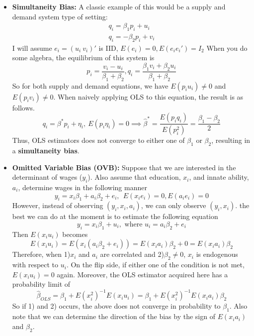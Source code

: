 \begin{itemize}
\begin{mdframed}[backgroundcolor=yellow!5] 
\begin{comment}[Comment on Measurement Errors]
So how do we address the endogeneity problem?
\begin{itemize}
\item If there exists another noisy, but unbiased measure of $x_i^*$, namely $w_i=x_i^*+\delta_i$, we can use $w_i$ to instrument for $x_i$. The condition is that $\eta_i$ has mean zero and uncorrelated with $(x_i^*, e_i. v_i)$. Try verifying that this satisfies all IV conditions. 
\item If there is a measurement error in $y_i$, the only this it does is to change the component of $e_i$. Assuming all the old assumptions hold, this does not pose as much problem as having a measurement error in the regressor. 
\end{itemize}
\end{comment}
\end{mdframed}
\item \textbf{Simultaneity Bias: } A classic example of this would be a supply and demand system type of setting:
\begin{gather*}
q_i = \beta_1p_i+u_i \tag{Supply}\\
q_i = -\beta_2p_i+v_i \tag{Demand}
\end{gather*}
I will assume $e_i = (u_i \ v_i)'$ is IID, $E(e_i)=0, E(e_ie_i')=I_{2}$
When you do some algebra, the equilibrium of this system is 
\[
p_i = \frac{v_i-u_i}{\beta_1+\beta_2}, q_i = \frac{\beta_1v_i + \beta_2u_i}{\beta_1+\beta_2}
\]
So for both supply and demand equations, we have $E(p_iu_i)\neq0$ and $E(p_iv_i)\neq0$. When naively applying OLS to this equation, the result is as follows. 
\[
q_i=\beta^*p_i+\eta_i, \ E(p_i\eta_i)=0 \implies \hat{\beta}^*=\frac{E(p_iq_i)}{E(p_i^2)}=\frac{\beta_1-\beta_2}{2}
\]
Thus, OLS estimators does not converge to either one of $\beta_1$ or $\beta_2$, resulting in a \textbf{simultaneity bias}.  
\item \textbf{Omitted Variable Bias (OVB): } Suppose that we are interested in the determinant of wages ($y_i$). Also assume that education, $x_i$, and innate ability,  $a_i$, determine wages in the following manner
\[
y_ i = x_i\beta_1+a_i\beta_2+e_i, \ \ E(x_ie_i)=0, E(a_ie_i)=0
\]
However, instead of observing $(y_i,x_i,a_i)$, we can only observe $(y_i, x_i)$. the best we can do at the moment is to estimate the following equation
\[
y_i=x_i\beta_1+u_i,\text{ where } u_i=a_i\beta_2 + e_i
\] 
Then $E(x_iu_i)$ becomes
\[
E(x_iu_i)= E(x_i(a_i\beta_2+e_i))=E(x_ia_i)\beta_2+0 = E(x_ia_i)\beta_2
\]
Therefore, when 1)$x_i$ and $a_i$ are correlated and 2)$\beta_2\neq0$, $x_i$ is endogenous with respect to $u_i$. On the flip side, if either one of the condition is not met, $E(x_iu_i)=0$ again. Moreover, the OLS estimator acquired here has a probability limit of
\[
\hat{\beta}_{OLS}=\beta_1+E(x_i^2)^{-1}E(x_iu_i)=\beta_1+E(x_i^2)^{-1}E(x_ia_i)\beta_2
\]
So if 1) and 2) occurs, the above does not converge in probability to $\beta_1$. Also note that we can determine the direction of the bias by the sign of $E(x_ia_i)$ and $\beta_2$. 
\end{itemize}

